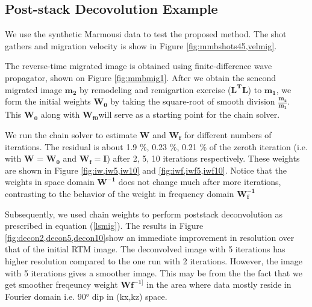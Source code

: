 \subsection{Post-stack Decovolution Example}
We use the synthetic Marmousi data to test the proposed method. The shot gathers and migration velocity is show in Figure \ref{fig:mmbshots45,velmig}.




The reverse-time migrated image is obtained using finite-difference wave propagator, shown on Figure \ref{fig:mmbmig1}. After we obtain the sencond migrated image $\mathbf{m_2}$ by remodeling and remigartion exercise ($\mathbf{L^{T}L}$) to $\mathbf{m_1}$, we form the initial weights $\mathbf{W_0}$ by taking the square-root of smooth division $\mathbf{\frac{m_2}{m_1}}$. This $\mathbf{W_0}$ along with $\mathbf{W_{f0}}$will serve as a starting point for the chain solver.

We run the chain solver to estimate $\mathbf{W}$ and $\mathbf{W_f}$ for different numbers of iterations. The residual is about 1.9 $\%$, 0.23 $\%$, 0.21 $\%$ of the zeroth iteration (i.e. with $\mathbf{W}$ = $\mathbf{W_0}$ and $\mathbf{W_f} = \mathbf{I}$) after 2, 5, 10 iterations respectively. These weights are shown in Figure \ref{fig:iw,iw5,iw10} and \ref{fig:iwf,iwf5,iwf10}. Notice that the weights in space domain $\mathbf{W^{-1}}$ does not change much after more iterations, contrasting to the behavior of the weight in frequency domain $\mathbf{W_f^{-1}}$

Subsequently, we used chain weights to perform poststack deconvolution as prescribed in equation (\ref{lsmig}). The results in Figure \ref{fig:decon2,decon5,decon10}show an immediate improvement in resolution over that of the initial RTM image. The deconvolved image with 5 iterations has higher resolution compared to the one run with 2 iterations. However, the image with 5 iterations gives a smoother image. This may be from the the fact that we get smoother freqeuncy weight $\mathbf{Wf^{-1]}}$ in the area where data mostly reside in Fourier domain i.e. 90° dip in (kx,kz) space.




